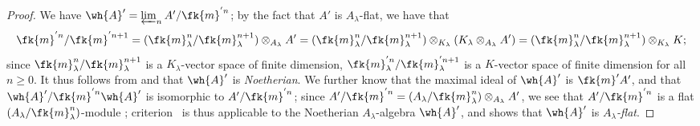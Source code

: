 \begin{proof}
We have $\wh{A}'=\varprojlim_n A'/\fk{m}^{'n}$;
by the fact that $A'$ is $A_\lambda$-flat, we have that
\[
    \fk{m}^{'n}/\fk{m}^{'n+1} = (\fk{m}_\lambda^{n}/\fk{m}_\lambda^{n+1})\otimes_{A_\lambda}A' = (\fk{m}_\lambda^{n}/\fk{m}_\lambda^{n+1})\otimes_{K_\lambda}(K_\lambda\otimes_{A_\lambda}A') = (\fk{m}_\lambda^{n}/\fk{m}_\lambda^{n+1})\otimes_{K_\lambda}K;
\]
since $\fk{m}_\lambda^{n}/\fk{m}_\lambda^{n+1}$ is a $K_\lambda$-vector space of finite dimension, $\fk{m}_\lambda^{'n}/\fk{m}_\lambda^{'n+1}$ is a $K$-vector space of finite dimension for all $n\geq0$.
It thus follows from  and  that $\wh{A}'$ is \emph{Noetherian}.
We further know that the maximal ideal of $\wh{A}'$ is $\fk{m}'A'$, and that $\wh{A}'/\fk{m}^{'n}\wh{A}'$ is isomorphic to $A'/\fk{m}^{'n}$;
since $A'/\fk{m}^{'n}=(A_\lambda/\fk{m}_\lambda^n)\otimes_{A_\lambda}A'$, we see that $A'/\fk{m}^{'n}$ is a flat $(A_\lambda/\fk{m}_\lambda^n)$-module ;
criterion~ is thus applicable to the Noetherian $A_\lambda$-algebra $\wh{A}'$, and shows that $\wh{A}'$ is \emph{$A_\lambda$-flat}.
\end{proof}

